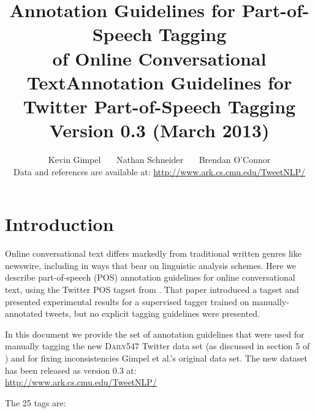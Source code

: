 \documentclass[11pt,letterpaper]{article}
\title{Annotation Guidelines for Part-of-Speech Tagging\\ of Online Conversational Text}
\title{Annotation Guidelines for Twitter Part-of-Speech Tagging\\Version 0.3 (March 2013)}
\author{Kevin Gimpel \ \ \ Nathan Schneider \ \ \ Brendan O'Connor \\
Data and references are available at:
\url{http://www.ark.cs.cmu.edu/TweetNLP/}
 }
\begin{document}
\maketitle

\section{Introduction}

Online conversational text differs markedly from traditional written genres like newswire, 
including in ways that bear on linguistic analysis schemes. Here we describe part-of-speech (POS) annotation guidelines for online conversational text, using the Twitter POS tagset from .
That paper introduced a tagset and presented experimental 
results for a supervised tagger trained on manually-annotated tweets, but no explicit tagging guidelines were presented. 

In this document we provide the set of annotation guidelines that were used for manually tagging the new \textsc{Daily547} Twitter data set (as discussed in section 5 of )
and for fixing inconsistencies Gimpel et al.'s original data set.
The new dataset has been released as version 0.3 at: \\ \url{http://www.ark.cs.cmu.edu/TweetNLP/}

The 25 tags are:

\newcommand{\tagname}[1]{\textbf{#1}}
\end{document}
